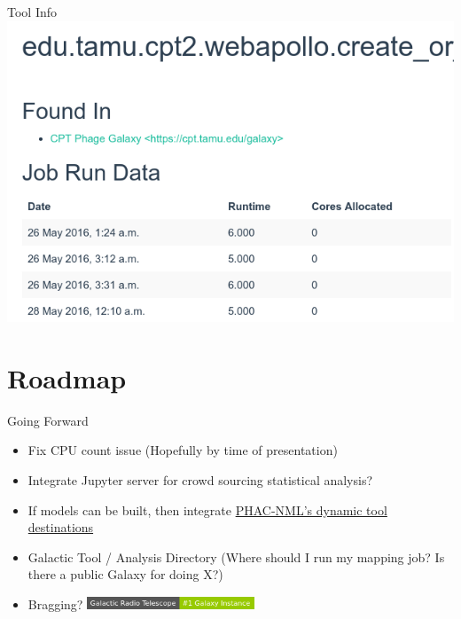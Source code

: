 \documentclass[12pt]{beamer}
\begin{document}
\begin{frame}{Tool Info}
    \includegraphics[width=\textwidth]{./img/tool-info.png}
\end{frame}

\section{Roadmap}
\begin{frame}{Going Forward}
    \begin{itemize}
        \item Fix CPU count issue (Hopefully by time of presentation)
        \item Integrate Jupyter server for crowd sourcing statistical analysis?
        \item If models can be built, then integrate \href{https://github.com/phac-nml/dynamic-tool-destination}{PHAC-NML's dynamic tool destinations}
        \item Galactic Tool / Analysis Directory (Where should I run my mapping job? Is there a public Galaxy for doing X?)
        \item Bragging? \includegraphics[width=5cm]{./img/badge.png}
    \end{itemize}
\end{frame}
\end{document}
